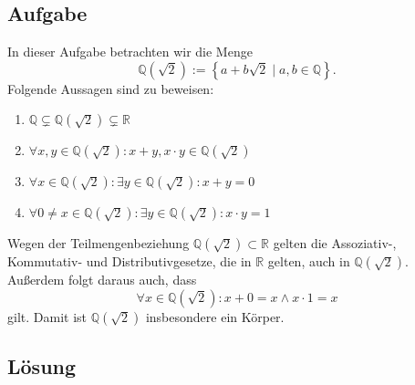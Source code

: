 \documentclass{article}
\newcommand{\Q}{\mathbb{Q}}
\newcommand{\R}{\mathbb{R}}
\newcommand{\adjunction}[2]{#1(#2)}
\newcommand{\fa}[1]{\forall #1 \colon}
\newcommand{\ex}[1]{\exists #1 \colon}
\begin{document}
\subsection*{Aufgabe}
In dieser Aufgabe betrachten wir die Menge
\[
  \adjunction{\Q}{\sqrt 2}
  :=
  \left\{ a + b \sqrt{2} \mid  a,b \in \Q \right\}.
\]
Folgende Aussagen sind zu beweisen:
\begin{enumerate}
\item \( \Q \subsetneq \adjunction{\Q}{\sqrt 2} \subsetneq \R\)
\item
  \( \fa{x,y \in \adjunction{\Q}{\sqrt 2}} x + y, x \cdot y \in
  \adjunction{\Q}{\sqrt 2}\)
\item
  \( \fa{x \in \adjunction{\Q}{\sqrt{2}}} \ex{y \in \adjunction{\Q}{\sqrt{2}}}
    x + y = 0\)
  \item
    \( \fa{0 \neq x \in \adjunction{\Q}{\sqrt{2}}} \ex{y \in
      \adjunction{\Q}{\sqrt{2}}} x \cdot y = 1\)
\end{enumerate}
Wegen der Teilmengenbeziehung \(\adjunction{\Q}{\sqrt 2} \subset \R\) gelten
die Assoziativ-, Kommutativ- und Distributivgesetze, die in \(\R\) gelten, auch
in \(\adjunction{\Q}{\sqrt 2}\). Außerdem folgt daraus auch, dass
\[
  \fa{x \in \adjunction{\Q}{\sqrt{2}}} x + 0 = x \land x \cdot 1 = x
\]
gilt. Damit ist \(\adjunction{\Q}{\sqrt{2}}\) insbesondere ein Körper.

\subsection*{Lösung}
\end{document}
